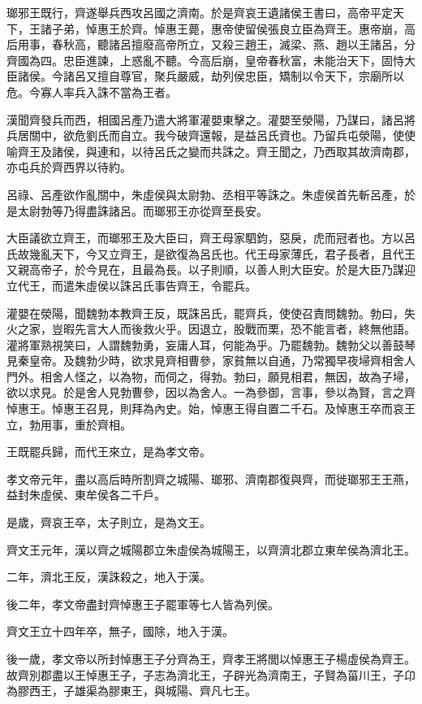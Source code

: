 瑯邪王既行，齊遂舉兵西攻呂國之濟南。於是齊哀王遺諸侯王書曰，高帝平定天下，王諸子弟，悼惠王於齊。悼惠王薨，惠帝使留侯張良立臣為齊王。惠帝崩，高后用事，春秋高，聽諸呂擅廢高帝所立，又殺三趙王，滅梁、燕、趙以王諸呂，分齊國為四。忠臣進諫，上惑亂不聽。今高后崩，皇帝春秋富，未能治天下，固恃大臣諸侯。今諸呂又擅自尊官，聚兵嚴威，劫列侯忠臣，矯制以令天下，宗廟所以危。今寡人率兵入誅不當為王者。

漢聞齊發兵而西，相國呂產乃遣大將軍灌嬰東擊之。灌嬰至滎陽，乃謀曰，諸呂將兵居關中，欲危劉氏而自立。我今破齊還報，是益呂氏資也。乃留兵屯滎陽，使使喻齊王及諸侯，與連和，以待呂氏之變而共誅之。齊王聞之，乃西取其故濟南郡，亦屯兵於齊西界以待約。

呂祿、呂產欲作亂關中，朱虛侯與太尉勃、丞相平等誅之。朱虛侯首先斬呂產，於是太尉勃等乃得盡誅諸呂。而瑯邪王亦從齊至長安。

大臣議欲立齊王，而瑯邪王及大臣曰，齊王母家駟鈞，惡戾，虎而冠者也。方以呂氏故幾亂天下，今又立齊王，是欲復為呂氏也。代王母家薄氏，君子長者，且代王又親高帝子，於今見在，且最為長。以子則順，以善人則大臣安。於是大臣乃謀迎立代王，而遣朱虛侯以誅呂氏事告齊王，令罷兵。

灌嬰在滎陽，聞魏勃本教齊王反，既誅呂氏，罷齊兵，使使召責問魏勃。勃曰，失火之家，豈暇先言大人而後救火乎。因退立，股戰而栗，恐不能言者，終無他語。灌將軍熟視笑曰，人謂魏勃勇，妄庸人耳，何能為乎。乃罷魏勃。魏勃父以善鼓琴見秦皇帝。及魏勃少時，欲求見齊相曹參，家貧無以自通，乃常獨早夜埽齊相舍人門外。相舍人怪之，以為物，而伺之，得勃。勃曰，願見相君，無因，故為子埽，欲以求見。於是舍人見勃曹參，因以為舍人。一為參御，言事，參以為賢，言之齊悼惠王。悼惠王召見，則拜為內史。始，悼惠王得自置二千石。及悼惠王卒而哀王立，勃用事，重於齊相。

王既罷兵歸，而代王來立，是為孝文帝。

孝文帝元年，盡以高后時所割齊之城陽、瑯邪、濟南郡復與齊，而徙瑯邪王王燕，益封朱虛侯、東牟侯各二千戶。

是歲，齊哀王卒，太子則立，是為文王。

齊文王元年，漢以齊之城陽郡立朱虛侯為城陽王，以齊濟北郡立東牟侯為濟北王。

二年，濟北王反，漢誅殺之，地入于漢。

後二年，孝文帝盡封齊悼惠王子罷軍等七人皆為列侯。

齊文王立十四年卒，無子，國除，地入于漢。

後一歲，孝文帝以所封悼惠王子分齊為王，齊孝王將閭以悼惠王子楊虛侯為齊王。故齊別郡盡以王悼惠王子，子志為濟北王，子辟光為濟南王，子賢為菑川王，子卬為膠西王，子雄渠為膠東王，與城陽、齊凡七王。

